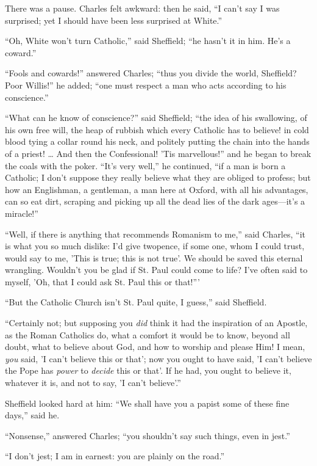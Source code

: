 There was a pause. Charles felt awkward: then he said, ``I can't
say I was surprised; yet I should have been less surprised at
White.''

``Oh, White won't turn Catholic,'' said Sheffield; ``he
hasn't it in him. He's a coward.''

``Fools and cowards!'' answered Charles; ``thus you
divide the world, Sheffield? Poor Willis!'' he added; ``one
must respect a man who acts according to his conscience.''

``What can he know of conscience?'' said Sheffield;
``the idea of his swallowing, of his own free will, the heap of
rubbish which every Catholic has to believe! in cold blood tying a
collar round his neck, and politely putting the chain into the hands
of a priest! … And then the Confessional! 'Tis marvellous!'' and
he began to break the coals with the poker. ``It's very
well,'' he continued, ``if a man is born a Catholic; I don't
suppose they really believe what they are obliged to profess;
but how an Englishman, a gentleman, a man here at Oxford, with all his
advantages, can so eat dirt, scraping and picking up all the dead lies
of the dark ages—it's a miracle!''

``Well, if there is anything that recommends Romanism to
me,'' said Charles, ``it is what you so much dislike: I'd give
twopence, if some one, whom I could trust, would say to me, 'This is
true; this is not true'. We should be saved this eternal wrangling.
Wouldn't you be glad if St. Paul could come to life? I've often said
to myself, 'Oh, that I could ask St. Paul this or that!'''

``But the Catholic Church isn't St. Paul quite, I guess,''
said Sheffield.

``Certainly not; but supposing you \emph{did} think it had the
inspiration of an Apostle, as the Roman Catholics do, what a comfort
it would be to know, beyond all doubt, what to believe about God, and
how to worship and please Him! I mean, \emph{you} said, 'I can't
believe this or that'; now you ought to have said, 'I can't believe
the Pope has \emph{power} to \emph{decide} this or that'. If he had,
you ought to believe it, whatever it is, and not to say, 'I can't
believe'.''

Sheffield looked hard at him: ``We shall have you a papist some
of these fine days,'' said he.

``Nonsense,'' answered Charles; ``you shouldn't say
such things, even in jest.''

``I don't jest; I am in earnest: you are plainly on the
road.''

